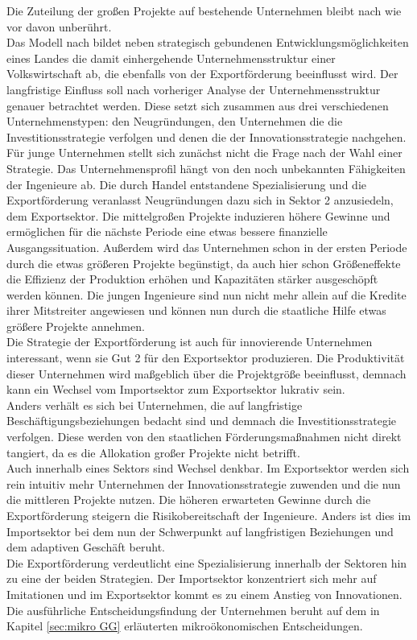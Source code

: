 Die Zuteilung der großen Projekte auf bestehende Unternehmen bleibt nach wie vor davon unberührt. \\
Das Modell nach \cite{Acemoglu.2006} bildet neben strategisch gebundenen Entwicklungsmöglichkeiten eines Landes die damit einhergehende Unternehmensstruktur einer Volkswirtschaft ab, die ebenfalls von der Exportförderung beeinflusst wird. Der langfristige Einfluss soll nach vorheriger Analyse der Unternehmensstruktur genauer betrachtet werden. Diese setzt sich zusammen aus drei verschiedenen Unternehmenstypen: den Neugründungen, den Unternehmen die die Investitionsstrategie verfolgen und denen die der Innovationsstrategie nachgehen.\\ 


Für junge Unternehmen stellt sich zunächst nicht die Frage nach der Wahl einer Strategie. Das Unternehmensprofil hängt von den noch unbekannten Fähigkeiten der Ingenieure ab. Die durch Handel entstandene Spezialisierung und die Exportförderung veranlasst Neugründungen dazu sich in Sektor 2 anzusiedeln, dem Exportsektor. Die mittelgroßen Projekte induzieren höhere Gewinne und ermöglichen für die nächste Periode eine etwas bessere finanzielle Ausgangssituation.
Außerdem wird das Unternehmen schon in der ersten Periode durch die etwas größeren Projekte begünstigt, da auch hier schon Größeneffekte die Effizienz der Produktion erhöhen und Kapazitäten stärker ausgeschöpft werden können. Die jungen Ingenieure sind nun nicht mehr allein auf die Kredite ihrer Mitstreiter angewiesen und können nun durch die staatliche Hilfe etwas größere Projekte annehmen.\\ 
Die Strategie der Exportförderung ist auch für innovierende Unternehmen interessant, wenn sie Gut 2 für den Exportsektor produzieren. Die Produktivität dieser Unternehmen wird maßgeblich über die Projektgröße beeinflusst, demnach kann ein Wechsel vom Importsektor zum Exportsektor lukrativ sein.\\ 


Anders verhält es sich bei Unternehmen, die auf langfristige Beschäftigungsbeziehungen bedacht sind und demnach die Investitionsstrategie verfolgen. Diese werden von den staatlichen Förderungsmaßnahmen nicht direkt tangiert, da es die Allokation großer Projekte nicht betrifft.\\ 


Auch innerhalb eines Sektors sind Wechsel denkbar. Im Exportsektor werden sich rein intuitiv mehr Unternehmen der Innovationsstrategie zuwenden und die nun die mittleren Projekte nutzen. Die höheren erwarteten Gewinne durch die Exportförderung steigern die Risikobereitschaft der Ingenieure. Anders ist dies im Importsektor bei dem nun der Schwerpunkt auf langfristigen Beziehungen und dem adaptiven Geschäft beruht.\\
Die Exportförderung verdeutlicht eine Spezialisierung innerhalb der Sektoren hin zu eine der beiden Strategien. Der Importsektor konzentriert sich mehr auf Imitationen und im Exportsektor kommt es zu einem Anstieg von Innovationen. Die ausführliche Entscheidungsfindung der Unternehmen beruht auf dem in Kapitel \ref{sec:mikro GG} erläuterten mikroökonomischen Entscheidungen.

